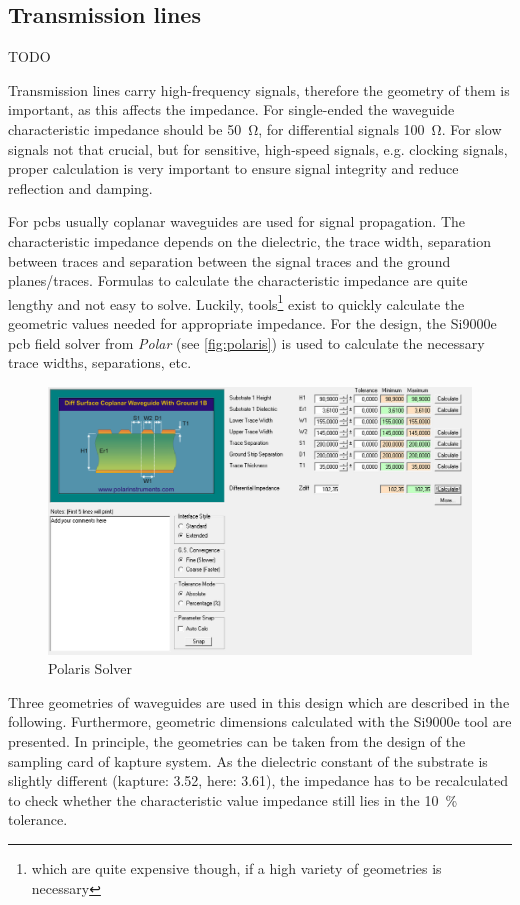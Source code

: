 \subsection{Transmission lines}
TODO 

Transmission lines carry high-frequency signals, therefore the geometry of them is important, as this affects the impedance.
For single-ended the waveguide characteristic impedance should be \SI{50}{\ohm}, for differential signals \SI{100}{\ohm}.
For slow signals not that crucial, but for sensitive, high-speed signals, e.g. clocking signals, proper calculation is very important to ensure signal integrity and reduce reflection and damping. 

For \glspl{pcb} usually coplanar waveguides are used for signal propagation.
The characteristic impedance depends on the dielectric, the trace width, separation between traces and separation between the signal traces and the ground planes/traces.
Formulas to calculate the characteristic impedance are quite lengthy and not easy to solve.
Luckily, tools\footnote{which are quite expensive though, if a high variety of geometries is necessary} exist to quickly calculate the geometric values needed for appropriate impedance. %
For the design, the Si9000e \gls{pcb} field solver from \textit{Polar} (see \autoref{fig:polaris}) is used to calculate the necessary trace widths, separations, etc.

\begin{figure}[tbh]
	\centering
	\includegraphics[width = \textwidth]{chap/04-work/img/polaris}
	\caption{Polaris Solver} %
	\label{fig:polaris}
\end{figure}

Three geometries of waveguides are used in this design which are described in the following.
Furthermore, geometric dimensions calculated with the Si9000e tool are presented.
In principle, the geometries can be taken from the design of the sampling card of \gls{kapture} system.
As the dielectric constant of the substrate is slightly different (\gls{kapture}: 3.52, here: 3.61), the impedance has to be recalculated to check whether the characteristic value impedance still lies in the \SI{10}{\percent} tolerance.


